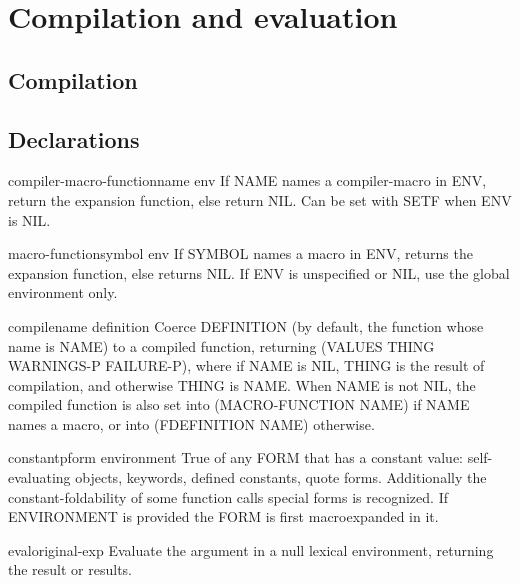 \chapter{Compilation and evaluation}

\section{Compilation}

\section{Declarations}

\begin{accessor}{compiler-macro-function}{name \op env}{}{}
  If NAME names a compiler-macro in ENV, return the expansion function, else
return NIL. Can be set with SETF when ENV is NIL.
\end{accessor}

\begin{accessor}{macro-function}{symbol \op env}{}{}
  If SYMBOL names a macro in ENV, returns the expansion function,
else returns NIL. If ENV is unspecified or NIL, use the global environment
only.
\end{accessor}

\begin{function}{compile}{name \op definition}{}{}
  Coerce DEFINITION (by default, the function whose name is NAME)
  to a compiled function, returning (VALUES THING WARNINGS-P FAILURE-P),
  where if NAME is NIL, THING is the result of compilation, and
  otherwise THING is NAME. When NAME is not NIL, the compiled function
  is also set into (MACRO-FUNCTION NAME) if NAME names a macro, or into
  (FDEFINITION NAME) otherwise.
\end{function}

\begin{function}{constantp}{form \op environment}{}{}
  True of any FORM that has a constant value: self-evaluating objects,
keywords, defined constants, quote forms. Additionally the
constant-foldability of some function calls special forms is recognized. If
ENVIRONMENT is provided the FORM is first macroexpanded in it.
\end{function}

\begin{function}{eval}{original-exp}{}{}
  Evaluate the argument in a null lexical environment, returning the
   result or results.
\end{function}

